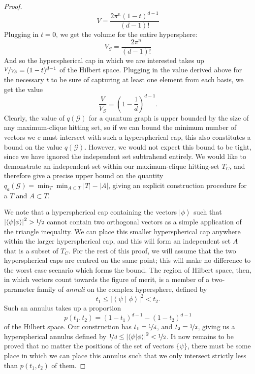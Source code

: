 \documentclass{amsart}
\theoremstyle{definition}
\newcommand{\ket}[1]{{\left\vert{#1}\right\rangle}}
\newcommand{\sprod}[2]{\left|\left< {#1} \middle| {#2} \right>\right|}
\begin{document}
\begin{proof}
\begin{equation}V=\frac{2\pi^n(1-t)^{d-1}}{(d-1)!}\end{equation}
Plugging in $t=0$, we get the volume for the entire hypersphere:
\begin{equation}V_S=\frac{2\pi^n}{(d-1)!}\end{equation}
And so the hyperspherical cap in which we are interested takes up $\nicefrac{V}{V_S}=(1-t)^{d-1}$ of the Hilbert space. Plugging in the value derived above for the necessary $t$ to be sure of capturing at least one element from each basis, we get the value
\begin{equation}
\frac{V}{V_S}=\left(1-\frac1d \right)^{d-1}.
\end{equation}
Clearly, the value of $q(\mathcal{G})$ for a quantum graph is upper bounded by the size of any maximum-clique hitting set, so if we can bound the minimum number of vectors we c must intersect with such a hyperspherical cap, this also constitutes a bound on the value $q(\mathcal{G})$. However, we would not expect this bound to be tight, since we have ignored the independent set subtrahend entirely. We would like to demonstrate an independent set within our maximum-clique hitting-set $T_C$, and therefore give a precise upper bound on the quantity $q_a(\mathcal{G})=\min_T \min_{A\subset T} |T|-|A|$, giving an explicit construction procedure for a $T$ and $A\subset T$.

We note that a hyperspherical cap containing the vectors $\ket{\phi}$ such that $\sprod{\psi}{\phi}^2> \nicefrac12$ cannot contain two orthogonal vectors as a simple application of the triangle inequality. We can place this smaller hyperspherical cap anywhere within the larger hyperspherical cap, and this will form an independent set $A$ that is a subset of $T_C$. For the rest of this proof, we will assume that the two hyperspherical caps are centred on the same point; this will make no difference to the worst case scenario which forms the bound. The region of Hilbert space, then, in which vectors count towards the figure of merit, is a member of a two-parameter family of \emph{annuli} on the complex hypersphere, defined by
\begin{equation}
t_1\leq\sprod{\psi}{\phi}^2< t_2.
\end{equation}
Such an annulus takes up a proportion 
\begin{equation}p(t_1,t_2)=\left(1-t_1 \right)^{d-1}-\left(1-t_2 \right)^{d-1}\end{equation}
of the Hilbert space. Our construction has $t_1=\nicefrac1d$, and $t_2=\nicefrac12$, giving us a hyperspherical annulus defined by
$\nicefrac1d\leq\sprod{\psi}{\phi}^2< \nicefrac12$.
It now remains to be proved that no matter the positions of the set of vectors $\{\psi\}$, there must be some place in which we can place this annulus such that we only intersect strictly less than $p(t_1,t_2)$ of them. 


\end{proof}
\end{document}
